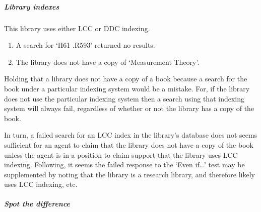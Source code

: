 \subparagraph{Library indexes}

\begin{note}
  This library uses either LCC or DDC indexing.
  \begin{enumerate}
  \item A search for `H61 .R593' returned no results.
  \item The library does not have a copy of `Measurement Theory'.
  \end{enumerate}

  Holding that a library does not have a copy of a book because a search for the book under a particular indexing system would be a mistake.
  For, if the library does not use the particular indexing system then a search using that indexing system will always fail, regardless of whether or not the library has a copy of the book.

  In turn, a failed search for an LCC index in the library's database does not seems sufficient for an agent to claim that the library does not have a copy of the book unless the agent is in a position to claim support that the library uses LCC indexing.
  Following, it seems the failed response to the `Even if\dots' test may be supplemented by noting that the library is a research library, and therefore likely uses LCC indexing, etc.\
\end{note}

\subparagraph{Spot the difference}

